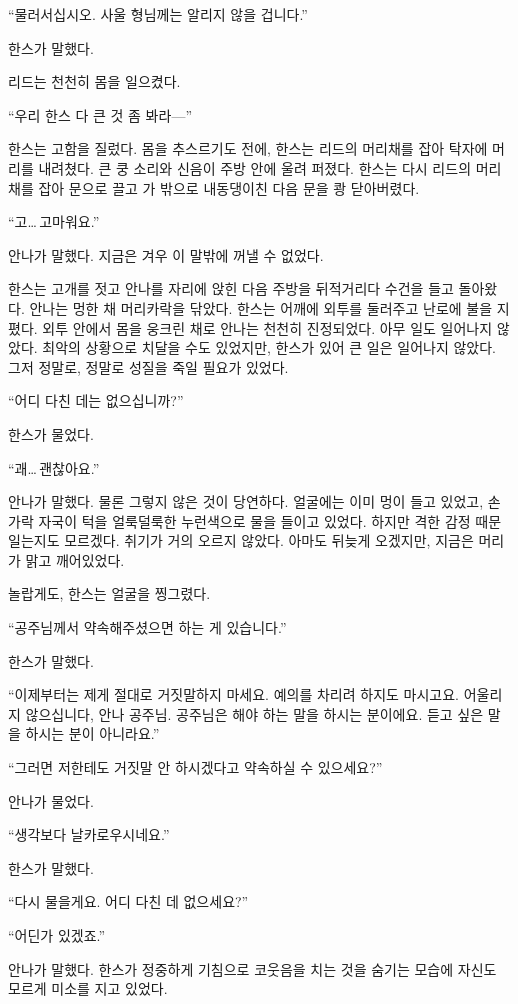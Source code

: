 ``물러서십시오. 사울 형님께는 알리지 않을 겁니다.''

한스가 말했다.

리드는 천천히 몸을 일으켰다.

``우리 한스 다 큰 것 좀 봐라—''

한스는 고함을 질렀다. 몸을 추스르기도 전에, 한스는 리드의 머리채를 잡아 탁자에 머리를 내려쳤다. 큰 쿵 소리와 신음이 주방 안에 울려 퍼졌다. 한스는 다시 리드의 머리채를 잡아 문으로 끌고 가 밖으로 내동댕이친 다음 문을 쾅 닫아버렸다.

``고\ldots\,고마워요.''

안나가 말했다. 지금은 겨우 이 말밖에 꺼낼 수 없었다.

한스는 고개를 젓고 안나를 자리에 앉힌 다음 주방을 뒤적거리다 수건을 들고 돌아왔다. 안나는 멍한 채 머리카락을 닦았다. 한스는 어깨에 외투를 둘러주고 난로에 불을 지폈다. 외투 안에서 몸을 웅크린 채로 안나는 천천히 진정되었다. 아무 일도 일어나지 않았다. 최악의 상황으로 치달을 수도 있었지만, 한스가 있어 큰 일은 일어나지 않았다. 그저 정말로, 정말로 성질을 죽일 필요가 있었다.

``어디 다친 데는 없으십니까?''

한스가 물었다.

``괘\ldots\,괜찮아요.''

안나가 말했다. 물론 그렇지 않은 것이 당연하다. 얼굴에는 이미 멍이 들고 있었고, 손가락 자국이 턱을 얼룩덜룩한 누런색으로 물을 들이고 있었다. 하지만 격한 감정 때문일는지도 모르겠다. 취기가 거의 오르지 않았다. 아마도 뒤늦게 오겠지만, 지금은 머리가 맑고 깨어있었다.

놀랍게도, 한스는 얼굴을 찡그렸다.

``공주님께서 약속해주셨으면 하는 게 있습니다.''

한스가 말했다.

``이제부터는 제게 절대로 거짓말하지 마세요. 예의를 차리려 하지도 마시고요. 어울리지 않으십니다, 안나 공주님. 공주님은 해야 하는 말을 하시는 분이에요. 듣고 싶은 말을 하시는 분이 아니라요.''

``그러면 저한테도 거짓말 안 하시겠다고 약속하실 수 있으세요?''

안나가 물었다.

``생각보다 날카로우시네요.''

한스가 말했다.

``다시 물을게요. 어디 다친 데 없으세요?''

``어딘가 있겠죠.''

안나가 말했다. 한스가 정중하게 기침으로 코웃음을 치는 것을 숨기는 모습에 자신도 모르게 미소를 지고 있었다. 

